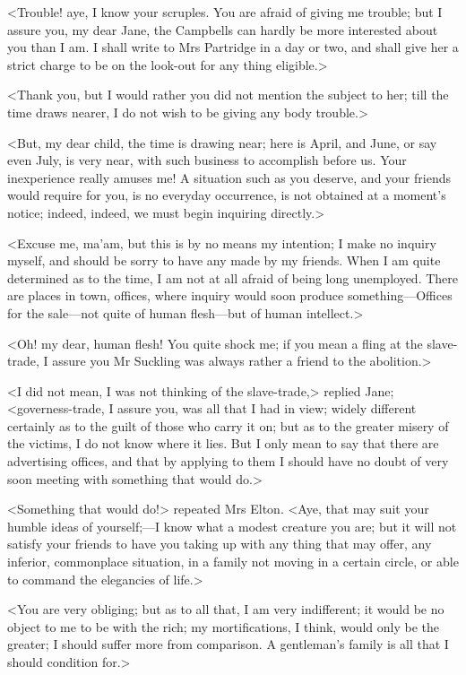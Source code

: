 <Trouble! aye, I know your scruples. You are afraid of giving me trouble; but I assure you, my dear Jane, the Campbells can hardly be more interested about you than I am. I shall write to Mrs Partridge in a day or two, and shall give her a strict charge to be on the look-out for any thing eligible.>

<Thank you, but I would rather you did not mention the subject to her; till the time draws nearer, I do not wish to be giving any body trouble.>

<But, my dear child, the time is drawing near; here is April, and June, or say even July, is very near, with such business to accomplish before us. Your inexperience really amuses me! A situation such as you deserve, and your friends would require for you, is no everyday occurrence, is not obtained at a moment's notice; indeed, indeed, we must begin inquiring directly.>

<Excuse me, ma'am, but this is by no means my intention; I make no inquiry myself, and should be sorry to have any made by my friends. When I am quite determined as to the time, I am not at all afraid of being long unemployed. There are places in town, offices, where inquiry would soon produce something—Offices for the sale—not quite of human flesh—but of human intellect.>

<Oh! my dear, human flesh! You quite shock me; if you mean a fling at the slave-trade, I assure you Mr Suckling was always rather a friend to the abolition.>

<I did not mean, I was not thinking of the slave-trade,> replied Jane; <governess-trade, I assure you, was all that I had in view; widely different certainly as to the guilt of those who carry it on; but as to the greater misery of the victims, I do not know where it lies. But I only mean to say that there are advertising offices, and that by applying to them I should have no doubt of very soon meeting with something that would do.>

<Something that would do!> repeated Mrs Elton. <Aye, that may suit your humble ideas of yourself;—I know what a modest creature you are; but it will not satisfy your friends to have you taking up with any thing that may offer, any inferior, commonplace situation, in a family not moving in a certain circle, or able to command the elegancies of life.>

<You are very obliging; but as to all that, I am very indifferent; it would be no object to me to be with the rich; my mortifications, I think, would only be the greater; I should suffer more from comparison. A gentleman's family is all that I should condition for.>

